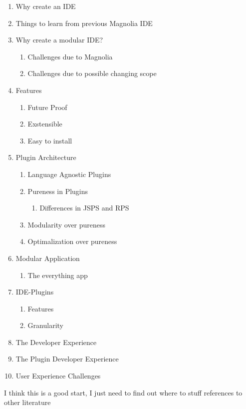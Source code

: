 \begin{enumerate}
  \item Why create an IDE
  \item Things to learn from previous Magnolia IDE
  \item Why create a modular IDE?
  \begin{enumerate}
    \item Challenges due to Magnolia
    \item Challenges due to possible changing scope
  \end{enumerate}
  \item Features
  \begin{enumerate}
    \item Future Proof
    \item Exstensible
    \item Easy to install
  \end{enumerate}
  \item Plugin Architecture
  \begin{enumerate}
    \item Language Agnostic Plugins
    \item Pureness in Plugins
    \begin{enumerate}
      \item Differences in JSPS and RPS
    \end{enumerate}
    \item Modularity over pureness
    \item Optimalization over pureness
  \end{enumerate}
  \item Modular Application
    \begin{enumerate}
      \item The everything app
    \end{enumerate}
  \item IDE-Plugins
    \begin{enumerate}
      \item Features
      \item Granularity
    \end{enumerate}
  \item The Developer Experience
  \item The Plugin Developer Experience
  \item User Experience Challenges
\end{enumerate}

I think this is a good start, I just need to find out where to stuff references
to other literature

